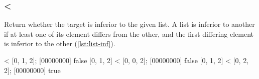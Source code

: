 \subsubsection{\textless}

Return whether the target is inferior to the given list. A list is
inferior to another if at least one of its element differs from the
other, and the first differing element is inferior to the other
(\autoref{lst:list-inf}).

\begin{urbiscript}[caption={\lstinline|List.'<'|}, label=lst:list-inf,
  float=\floatpos]
[0, 1, 2] < [0, 1, 2];
[00000000] false
[0, 1, 2] < [0, 0, 2];
[00000000] false
[0, 1, 2] < [0, 2, 2];
[00000000] true
\end{urbiscript}
